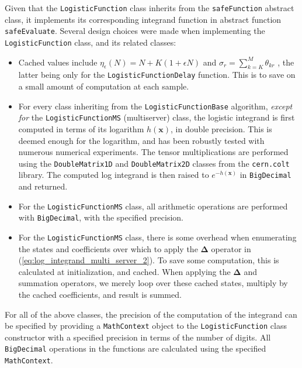 Given that the \texttt{LogisticFunction} class inherits from the \texttt{safeFunction} abstract class, it implements its corresponding integrand function in abstract function \texttt{safeEvaluate}. Several design choices were made when implementing the \texttt{LogisticFunction} class, and its related classes:
\begin{itemize}
    \item Cached values include \(\eta_{\epsilon}(N) = N+K(1+\epsilon N)\) and \(\sigma_r = \sum_{k=K}^M \theta_{kr}\) , the latter being only for the \texttt{LogisticFunctionDelay} function. This is to save on a small amount of computation at each sample.
    \item For every class inheriting from the \texttt{LogisticFunctionBase} algorithm, \textit{except for} the \texttt{LogisticFunctionMS} (multiserver) class, the logistic integrand is first computed in terms of its logarithm \(h(\mathbf{x})\), in double precision. This is deemed enough for the logarithm, and has been robustly tested with numerous numerical experiments. The tensor multiplications are performed using the \texttt{DoubleMatrix1D} and \texttt{DoubleMatrix2D} classes from the \texttt{cern.colt} library. The computed log integrand is then raised to \(e^{-h(\mathbf{x})}\) in \texttt{BigDecimal} and returned.
    \item For the \texttt{LogisticFunctionMS} class, all arithmetic operations are performed with \texttt{BigDecimal}, with the specified precision.
    \item For the \texttt{LogisticFunctionMS} class, there is some overhead when enumerating the states and coefficients over which to apply the \(\boldsymbol{\Delta}\) operator in (\ref{eq:log_integrand_multi_server_2}). To save some computation, this is calculated at initialization, and cached. When applying the \(\boldsymbol{\Delta}\) and summation operators, we merely loop over these cached states, multiply by the cached coefficients, and result is summed.
\end{itemize}

For all of the above classes, the precision of the computation of the integrand can be specified by providing a \texttt{MathContext} object to the \texttt{LogisticFunction} class constructor with a specified precision in terms of the number of digits. All \texttt{BigDecimal} operations in the functions are calculated using the specified \texttt{MathContext}.

